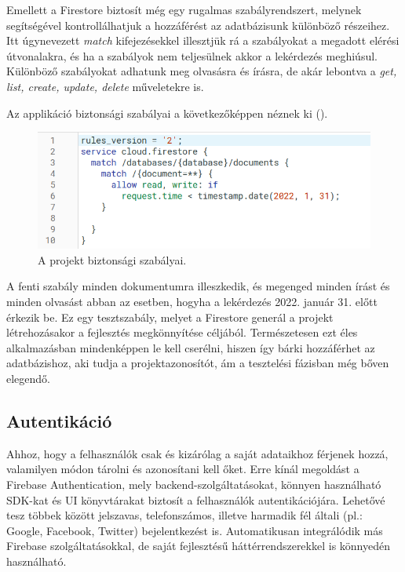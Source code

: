 Emellett a Firestore biztosít még egy rugalmas szabályrendszert, melynek segítségével kontrollálhatjuk a hozzáférést az adatbázisunk különböző részeihez. Itt úgynevezett \emph{match} kifejezésekkel illesztjük rá a szabályokat a megadott elérési útvonalakra, és ha a szabályok nem teljesülnek akkor a lekérdezés meghiúsul. Különböző szabályokat adhatunk meg olvasásra és írásra, de akár lebontva a \emph{get, list, create, update, delete} műveletekre is. 

Az applikáció biztonsági szabályai a következőképpen néznek ki ().

\begin{figure}[!ht]
	\centering
	\includegraphics[width=120mm, keepaspectratio]{figures/rules.png}
	\caption{A projekt biztonsági szabályai.}
	\label{fig:FirestoreRules}
\end{figure}

A fenti szabály minden dokumentumra illeszkedik, és megenged minden írást és minden olvasást abban az esetben, hogyha a lekérdezés 2022. január 31. előtt érkezik be. Ez egy tesztszabály, melyet a Firestore generál a projekt létrehozásakor a fejlesztés megkönnyítése céljából. Természetesen ezt éles alkalmazásban mindenképpen le kell cserélni, hiszen így bárki hozzáférhet az adatbázishoz, aki tudja a projektazonosítót, ám a tesztelési fázisban még bőven elegendő.

\subsection{Autentikáció}
Ahhoz, hogy a felhasználók csak és kizárólag a saját adataikhoz férjenek hozzá, valamilyen módon tárolni és azonosítani kell őket. Erre kínál megoldást a Firebase Authentication, mely backend-szolgáltatásokat, könnyen használható SDK-kat és UI könyvtárakat biztosít a felhasználók autentikációjára. Lehetővé tesz többek között jelszavas, telefonszámos, illetve harmadik fél általi (pl.: Google, Facebook, Twitter) bejelentkezést is. Automatikusan integrálódik más Firebase szolgáltatásokkal, de saját fejlesztésű háttérrendszerekkel is könnyedén használható.  \cite{Auth}  

